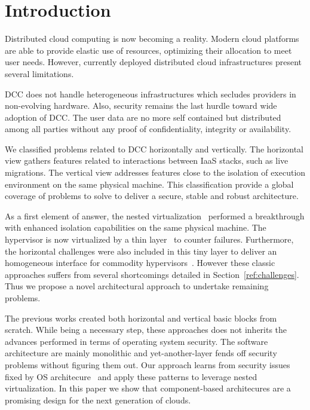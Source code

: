 \documentclass{sig-alternate}
\begin{document}
\section{Introduction}
\label{sec:intro}

\noindent Distributed cloud computing is now becoming a reality. Modern cloud platforms are able to provide elastic use of resources, optimizing their allocation to meet user needs. However, currently deployed distributed cloud infrastructures present several limitations.

DCC does not handle heterogeneous infrastructures which secludes providers in non-evolving hardware.
Also, security remains the last hurdle toward wide adoption of DCC. The user data are no more self contained but distributed among all parties without any proof of confidentiality, integrity or availability.

We classified problems related to DCC horizontally and vertically. The horizontal view gathers features related to interactions between IaaS stacks, such as live migrations. The vertical view addresses features close to the isolation of execution environment on the same physical machine. This classification provide a global coverage of problems to solve to deliver a secure, stable and robust architecture.

As a first element of answer, the nested virtualization~\cite{turtle:ibm} performed a breakthrough with enhanced isolation capabilities on the same physical machine. The hypervisor is now virtualized by a thin layer~\cite{cloudvisor:zhang} to counter failures. Furthermore, the horizontal challenges were also included in this tiny layer to deliver an homogeneous interface for commodity hypervisors~\cite{art:blan, xclo:blank}. However these classic approaches suffers from several shortcomings detailed in Section~\ref{ref:challenges}. Thus we propose a novel architectural approach to undertake remaining problems.

The previous works created both horizontal and vertical basic blocks from scratch. While being a necessary step, these approaches does not inherits the advances performed in terms of operating system security. The software architecture are mainly monolithic and yet-another-layer fends off security problems without
figuring them out. Our approach learns from security issues fixed by OS architecure~\cite{} and apply these patterns to leverage nested virtualization. In this paper we show that component-based architecures are a promising design for the next generation of clouds.
\end{document}
